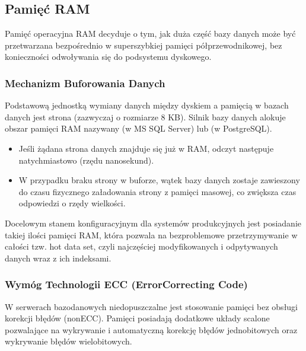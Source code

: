 \documentclass[letterpaper,10pt,polish]{sphinxmanual}
\begin{document}
\subsection{Pamięć RAM}
\label{\detokenize{rozdzia_u0142_2/rozdzia_u0142_21/index:pamiec-ram}}
\sphinxAtStartPar
Pamięć operacyjna RAM decyduje o tym, jak duża część bazy danych może być przetwarzana bezpośrednio w super\sphinxhyphen{}szybkiej pamięci półprzewodnikowej, bez konieczności odwoływania się do podsystemu dyskowego.


\subsubsection{Mechanizm Buforowania Danych}
\label{\detokenize{rozdzia_u0142_2/rozdzia_u0142_21/index:mechanizm-buforowania-danych}}
\sphinxAtStartPar
Podstawową jednostką wymiany danych między dyskiem a pamięcią w bazach danych jest strona (zazwyczaj o rozmiarze 8 KB). Silnik bazy danych alokuje obszar pamięci RAM nazywany  (w MS SQL Server) lub  (w PostgreSQL).
\begin{itemize}
\item {} 
\sphinxAtStartPar
{} Jeśli żądana strona danych znajduje się już w RAM, odczyt następuje natychmiastowo (rzędu nanosekund).

\item {} 
\sphinxAtStartPar
{} W przypadku braku strony w buforze, wątek bazy danych zostaje zawieszony do czasu fizycznego załadowania strony z pamięci masowej, co zwiększa czas odpowiedzi o rzędy wielkości.

\end{itemize}

\sphinxAtStartPar
Docelowym stanem konfiguracyjnym dla systemów produkcyjnych jest posiadanie takiej ilości pamięci RAM, która pozwala na bezproblemowe przetrzymywanie w całości tzw. hot data set, czyli najczęściej modyfikowanych i odpytywanych danych wraz z ich indeksami.


\subsubsection{Wymóg Technologii ECC (Error\sphinxhyphen{}Correcting Code)}
\label{\detokenize{rozdzia_u0142_2/rozdzia_u0142_21/index:wymog-technologii-ecc-error-correcting-code}}
\sphinxAtStartPar
W serwerach bazodanowych niedopuszczalne jest stosowanie pamięci bez obsługi korekcji błędów (non\sphinxhyphen{}ECC). Pamięci  posiadają dodatkowe układy scalone pozwalające na wykrywanie i automatyczną korekcję błędów jednobitowych oraz wykrywanie błędów wielobitowych.
\end{document}
